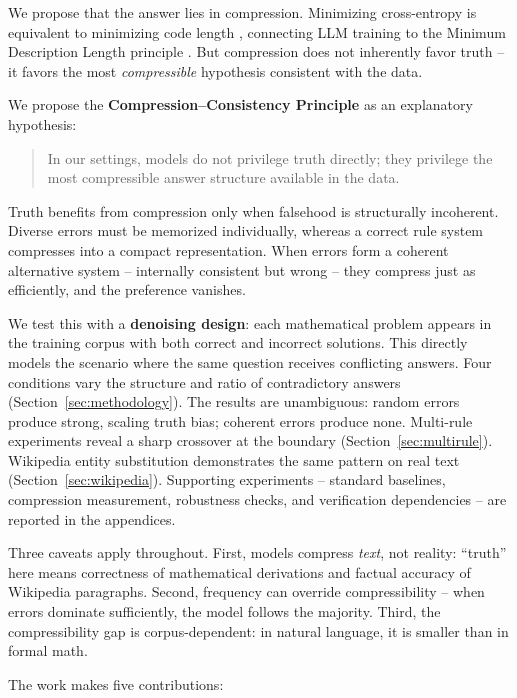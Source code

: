 \documentclass[10pt]{article} %
\begin{document}
We propose that the answer lies in compression. Minimizing cross-entropy is equivalent to minimizing code length \citep{shannon1948mathematical,deletang2024language}, connecting LLM training to the Minimum Description Length principle \citep{rissanen1978modeling,grunwald2007minimum}. But compression does not inherently favor truth -- it favors the most \textit{compressible} hypothesis consistent with the data.

We propose the \textbf{Compression--Consistency Principle} as an explanatory hypothesis:

\begin{quote}
In our settings, models do not privilege truth directly; they privilege the most compressible answer structure available in the data.
\end{quote}

Truth benefits from compression only when falsehood is structurally incoherent. Diverse errors must be memorized individually, whereas a correct rule system compresses into a compact representation. When errors form a coherent alternative system -- internally consistent but wrong -- they compress just as efficiently, and the preference vanishes.

We test this with a \textbf{denoising design}: each mathematical problem appears in the training corpus with both correct and incorrect solutions. This directly models the scenario where the same question receives conflicting answers. Four conditions vary the structure and ratio of contradictory answers (Section~\ref{sec:methodology}). The results are unambiguous: random errors produce strong, scaling truth bias; coherent errors produce none. Multi-rule experiments reveal a sharp crossover at the boundary (Section~\ref{sec:multirule}). Wikipedia entity substitution demonstrates the same pattern on real text (Section~\ref{sec:wikipedia}). Supporting experiments -- standard baselines, compression measurement, robustness checks, and verification dependencies -- are reported in the appendices.

Three caveats apply throughout. First, models compress \textit{text}, not reality: ``truth'' here means correctness of mathematical derivations and factual accuracy of Wikipedia paragraphs. Second, frequency can override compressibility -- when errors dominate sufficiently, the model follows the majority. Third, the compressibility gap is corpus-dependent: in natural language, it is smaller than in formal math.

The work makes five contributions:
\end{document}
